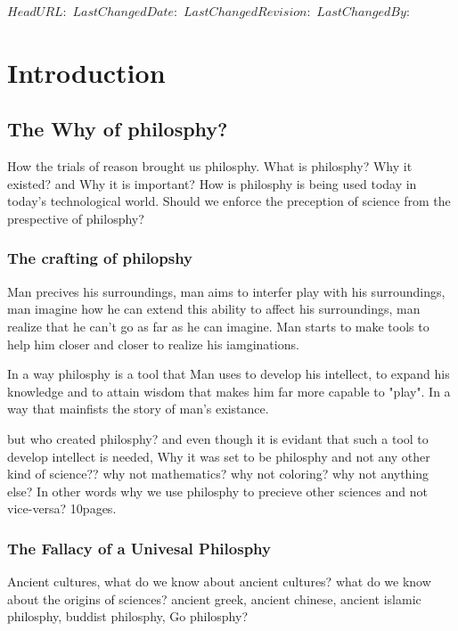 \svnidlong
{$HeadURL:  $}
{$LastChangedDate:  $}
{$LastChangedRevision:  $}
{$LastChangedBy:  $}
\chapter[Introduction]{Introduction}
\label{cha:introduction}
\section{The Why of philosphy?} 
How the trials of reason brought us philosphy.
What is philosphy? Why it existed? and Why it is important? How is philosphy is being used today in today's technological world.
Should we enforce the preception of science from the prespective of philosphy? 

\subsection{The crafting of philopshy}
Man precives his surroundings, man aims to interfer play with his surroundings, man imagine how he can extend this ability to affect his surroundings, man realize that he can't go as far as he can imagine. Man starts to make tools to help him closer and closer to realize his iamginations.

In a way philosphy is a tool that Man uses to develop his intellect, to expand his knowledge and to attain wisdom that makes him far more capable to "play". In a way that mainfists the story of man's existance.

but who created philosphy? and even though it is evidant that such a tool to develop intellect is needed, Why it was set to be philosphy and not any other kind of science?? why not mathematics? why not coloring? why not anything else? In other words why we use philosphy to precieve other sciences and not vice-versa? 10pages.

\subsection{The Fallacy of a Univesal Philosphy}
Ancient cultures, what do we know about ancient cultures? what do we know about the origins of sciences?
ancient greek, ancient chinese, ancient 
islamic philosphy, buddist philosphy, Go philosphy?

